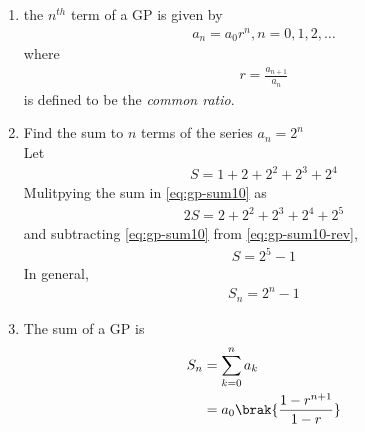 \begin{enumerate}[label=\thesubsection.\arabic*,ref=\thesubsection.\theenumi]
	\item the $n^{th}$ term of a GP is given by 
\begin{align}
	\label{eq:gp-nthterm}
	a_n = a_0r^n, n = 0,1,2, \dots 
\end{align}
where 
\begin{align}
	r = \frac{a_{n+1}}{a_n}
\end{align}
		is defined to be the {\em common ratio}.
\item Find the sum to $n$ terms of the series
$a_n = 2^n$
	\\
	\solution
	Let
\begin{align}
	\label{eq:gp-sum10}
	S = 1 + 2 + 2^2 + 2^3 + 2^4
\end{align}
Mulitpying the sum in
	\eqref{eq:gp-sum10}
	as
\begin{align}
	\label{eq:gp-sum10-rev}
	2S =  2 + 2^2 + 2^3 + 2^4+ 2^5
\end{align}
and  subtracting
	\eqref{eq:gp-sum10}
	from
	\eqref{eq:gp-sum10-rev},
\begin{align}
	\label{eq:gp-sum10-add}
	S = 2^5 - 1
\end{align}
In general, 
\begin{align}
	S_{n} = 2^{n}-1
\end{align}
\item The sum of a GP is 
\begin{align}
	S_n &= \sum_{k=0}^{n}a_k  
	\\
	&= a_0\brak{\frac{1-r^{n+1}}{1-r}}
	\label{eq:gp-sumn}
\end{align}
\end{enumerate}
